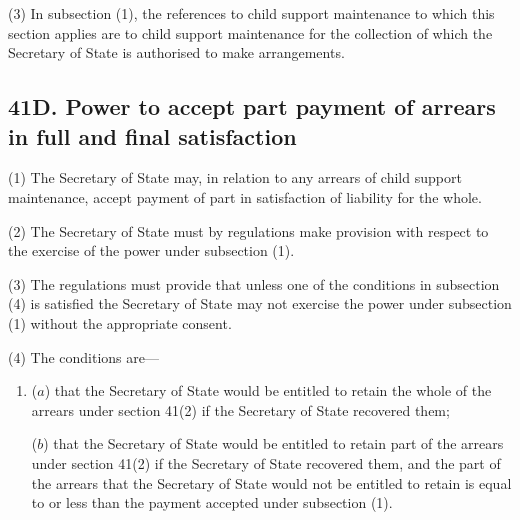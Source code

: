 \documentclass[a4paper]{article}
\begin{document}
(3)
In subsection (1), the references to child support maintenance to which this section applies are to child support maintenance for the collection of which the Secretary of State is authorised to make arrangements.


\subsection{41D. Power to accept part payment of arrears in full and final satisfaction}

(1) The 
Secretary of State
may, in relation to any arrears of child support  maintenance, accept payment of part in satisfaction of liability for the whole.

(2)
The Secretary of State must by regulations make provision with respect to the exercise of the power under subsection (1).

(3)
The regulations must provide that unless one of the conditions in subsection
(4)
is satisfied the 
Secretary of State %
may not exercise the power under subsection (1) without the appropriate consent.

(4)
The conditions are---
\begin{enumerate}\item[]
($a$) that the 
Secretary of State %
would be entitled to retain the whole of the arrears under section 41(2) if 
the Secretary of State %
recovered them;

($b$) that the 
Secretary of State %
would be entitled to retain part of the arrears under section 41(2) if 
the Secretary of State %
recovered them, and the part of the arrears that the 
Secretary of State %
would not be entitled to retain is equal to or less than the payment accepted under subsection (1).
\end{enumerate}
\end{document}

